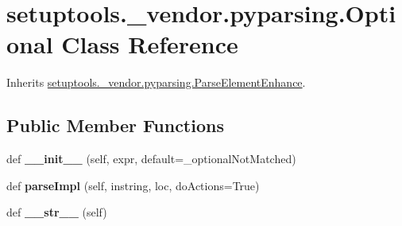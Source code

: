 \hypertarget{classsetuptools_1_1__vendor_1_1pyparsing_1_1_optional}{}\section{setuptools.\+\_\+vendor.\+pyparsing.\+Optional Class Reference}
\label{classsetuptools_1_1__vendor_1_1pyparsing_1_1_optional}


Inherits \hyperlink{classsetuptools_1_1__vendor_1_1pyparsing_1_1_parse_element_enhance}{setuptools.\+\_\+vendor.\+pyparsing.\+Parse\+Element\+Enhance}.

\subsection*{Public Member Functions}
\begin{DoxyCompactItemize}
\item 
\mbox{\label{classsetuptools_1_1__vendor_1_1pyparsing_1_1_optional_a03acdb87a4205db8e25a4ded39b732ce}} 
def {\bfseries \+\_\+\+\_\+init\+\_\+\+\_\+} (self, expr, default=\+\_\+optional\+Not\+Matched)
\item 
\mbox{\label{classsetuptools_1_1__vendor_1_1pyparsing_1_1_optional_a836f8c10ed1ac54f47ed8a99ed364114}} 
def {\bfseries parse\+Impl} (self, instring, loc, do\+Actions=True)
\item 
\mbox{\label{classsetuptools_1_1__vendor_1_1pyparsing_1_1_optional_aa773455e67fdf106d587585d384c1b4b}} 
def {\bfseries \+\_\+\+\_\+str\+\_\+\+\_\+} (self)
\end{DoxyCompactItemize}
